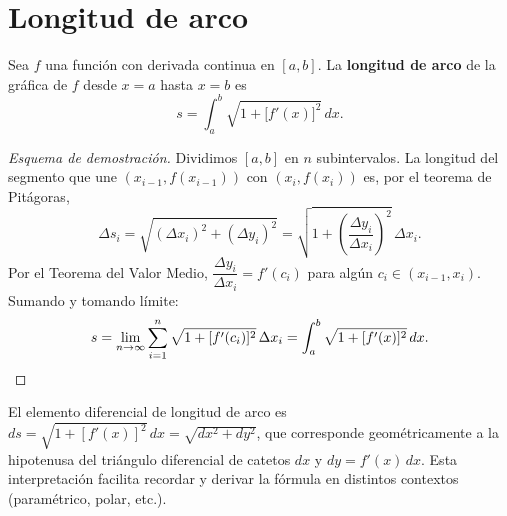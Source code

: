 \section{Longitud de arco}

\begin{definition}
Sea $f$ una función con derivada continua en $[a,b]$. La
\textbf{longitud de arco} de la gráfica de $f$ desde $x=a$ hasta $x=b$ es
\[
  s = \int_a^b\sqrt{1+\bigl[f'(x)\bigr]^2}\,dx.
\]
\end{definition}

\begin{proof}[Esquema de demostración]
Dividimos $[a,b]$ en $n$ subintervalos. La longitud del segmento que une
$(x_{i-1},f(x_{i-1}))$ con $(x_i,f(x_i))$ es, por el teorema de Pitágoras,
\[
  \Delta s_i = \sqrt{(\Delta x_i)^2+(\Delta y_i)^2}
             = \sqrt{1+\!\left(\frac{\Delta y_i}{\Delta x_i}\right)^{\!2}}
               \,\Delta x_i.
\]
Por el Teorema del Valor Medio, $\dfrac{\Delta y_i}{\Delta x_i}=f'(c_i)$
para algún $c_i\in(x_{i-1},x_i)$. Sumando y tomando límite:
\[
  s = \lim_{n\to\infty}\sum_{i=1}^n\sqrt{1+[f'(c_i)]^2}\,\Delta x_i
    = \int_a^b\sqrt{1+[f'(x)]^2}\,dx.\qedhere
\]
\end{proof}

\begin{rem}
El elemento diferencial de longitud de arco es
$ds=\sqrt{1+[f'(x)]^2}\,dx = \sqrt{dx^2+dy^2}$, que corresponde
geométricamente a la hipotenusa del triángulo diferencial de catetos $dx$
y $dy=f'(x)\,dx$. Esta interpretación facilita recordar y derivar la
fórmula en distintos contextos (paramétrico, polar, etc.).
\end{rem}

